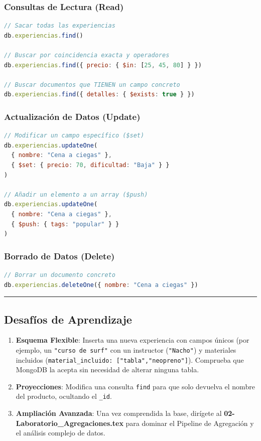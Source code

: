 \documentclass[12pt,a4paper]{article}
\begin{document}
\subsubsection{Consultas de Lectura (Read)}
\begin{lstlisting}[language=JavaScript]
// Sacar todas las experiencias
db.experiencias.find()

// Buscar por coincidencia exacta y operadores
db.experiencias.find({ precio: { $in: [25, 45, 80] } })

// Buscar documentos que TIENEN un campo concreto
db.experiencias.find({ detalles: { $exists: true } })
\end{lstlisting}

\subsubsection{Actualización de Datos (Update)}
\begin{lstlisting}[language=JavaScript]
// Modificar un campo específico ($set)
db.experiencias.updateOne(
  { nombre: "Cena a ciegas" },
  { $set: { precio: 70, dificultad: "Baja" } }
)

// Añadir un elemento a un array ($push)
db.experiencias.updateOne(
  { nombre: "Cena a ciegas" },
  { $push: { tags: "popular" } }
)
\end{lstlisting}

\subsubsection{Borrado de Datos (Delete)}
\begin{lstlisting}[language=JavaScript]
// Borrar un documento concreto
db.experiencias.deleteOne({ nombre: "Cena a ciegas" })
\end{lstlisting}

\begin{center}\rule{0.5\linewidth}{0.5pt}\end{center}

\subsection{Desafíos de Aprendizaje}\label{desafios}

\begin{enumerate}
    \item \textbf{Esquema Flexible}: Inserta una nueva experiencia con campos únicos (por ejemplo, un \texttt{"curso de surf"} con un instructor (\texttt{"Nacho"}) y materiales incluidos (\texttt{material\_incluido: ["tabla","neopreno"]}). Comprueba que MongoDB la acepta sin necesidad de alterar ninguna tabla.
    \item \textbf{Proyecciones}: Modifica una consulta \texttt{find} para que solo devuelva el nombre del producto, ocultando el \texttt{\_id}.
    \item \textbf{Ampliación Avanzada}: Una vez comprendida la base, dirígete al \textbf{02-Laboratorio\_Agregaciones.tex} para dominar el Pipeline de Agregación y el análisis complejo de datos.
\end{enumerate}
\end{document}
